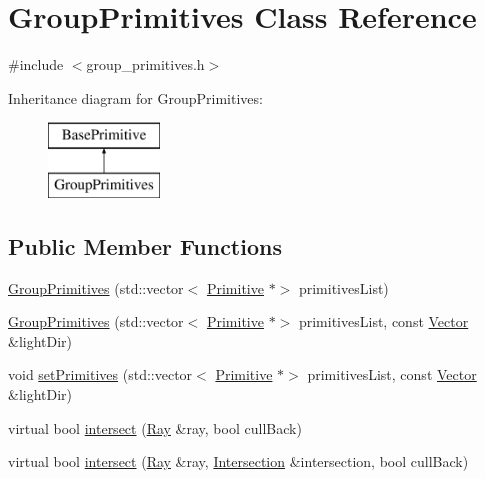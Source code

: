 \hypertarget{class_group_primitives}{}\section{Group\+Primitives Class Reference}
\label{class_group_primitives}


{\ttfamily \#include $<$group\+\_\+primitives.\+h$>$}

Inheritance diagram for Group\+Primitives\+:\begin{figure}[H]
\begin{center}
\leavevmode
\includegraphics[height=2.000000cm]{class_group_primitives}
\end{center}
\end{figure}
\subsection*{Public Member Functions}
\begin{DoxyCompactItemize}
\item 
\mbox{\hyperlink{class_group_primitives_ad09cb3eb5220543a5edf1f85a38e7244}{Group\+Primitives}} (std\+::vector$<$ \mbox{\hyperlink{class_primitive}{Primitive}} $\ast$$>$ primitives\+List)
\item 
\mbox{\hyperlink{class_group_primitives_a821c2b3b8a794ad486e518e313403e8f}{Group\+Primitives}} (std\+::vector$<$ \mbox{\hyperlink{class_primitive}{Primitive}} $\ast$$>$ primitives\+List, const \mbox{\hyperlink{struct_vector}{Vector}} \&light\+Dir)
\item 
void \mbox{\hyperlink{class_group_primitives_ace5b8c68e4a9f26416ccc4ab9ced8525}{set\+Primitives}} (std\+::vector$<$ \mbox{\hyperlink{class_primitive}{Primitive}} $\ast$$>$ primitives\+List, const \mbox{\hyperlink{struct_vector}{Vector}} \&light\+Dir)
\item 
virtual bool \mbox{\hyperlink{class_group_primitives_a17bca38224e782eb6660774b34947397}{intersect}} (\mbox{\hyperlink{class_ray}{Ray}} \&ray, bool cull\+Back)
\item 
virtual bool \mbox{\hyperlink{class_group_primitives_ac958af04e2e275f28cb74751ad87575a}{intersect}} (\mbox{\hyperlink{class_ray}{Ray}} \&ray, \mbox{\hyperlink{class_intersection}{Intersection}} \&intersection, bool cull\+Back)
\end{DoxyCompactItemize}
